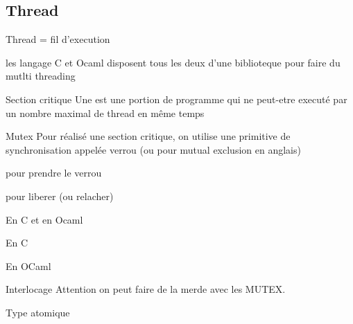 \documentclass[a4paper,french,bookmarks]{article}
\begin{document}
    \subsection{Thread}
    
    Thread = fil d'execution 
    
    les langage C et Ocaml disposent tous les deux d'une biblioteque pour faire du mutlti threading
    
    
    \begin{definition}{Section critique}{}
        Une  est une portion de programme qui ne peut-etre executé par un nombre maximal de thread en même temps  
    \end{definition}
    
    \begin{definition}{Mutex}{}
        Pour réalisé une section critique, on utilise une primitive de synchronisation appelée verrou (ou  pour mutual exclusion en anglais)
        
        \begin{enumerate}
            \itt {} pour prendre le verrou 
            
            \itt {} pour liberer (ou relacher)
        \end{enumerate}
        
    \end{definition}
    \begin{notation}{En C et en Ocaml}{}
        \begin{enumerate}
            \itt En C 
            
            \itt En OCaml 
            
            
        \end{enumerate}
    \end{notation}
    
    
    \begin{definition}{Interlocage}{}
        Attention on peut faire de la merde avec les MUTEX.
        
    \end{definition}
    
    
    \begin{definition}{Type atomique }
        
    \end{definition}
    
    
    
    
    
\end{document}

